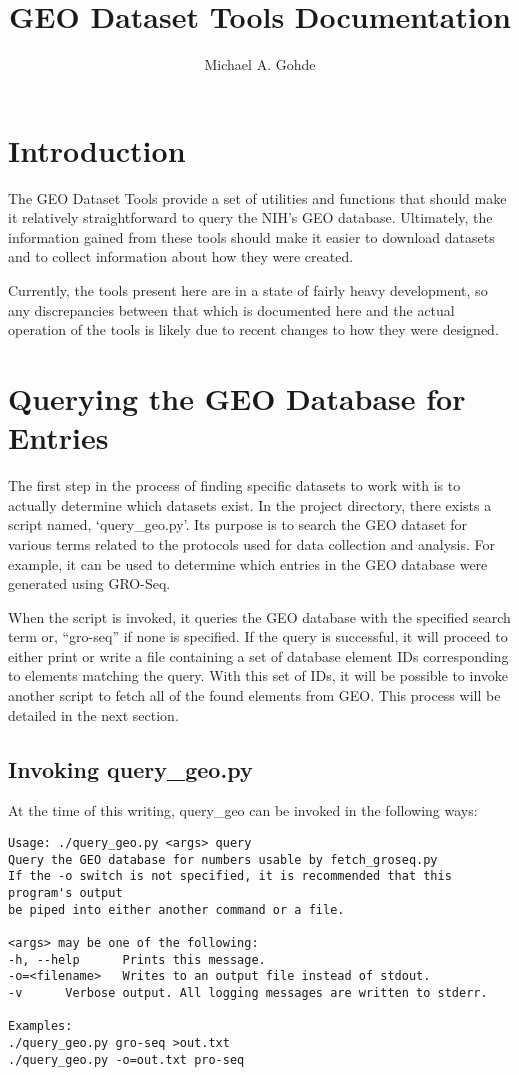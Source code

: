 \documentclass[12pt,letterpaper]{article}
\begin{document}
\title{GEO Dataset Tools Documentation}
\author{Michael A. Gohde}
\maketitle

\section{Introduction}
The GEO Dataset Tools provide a set of utilities and functions that should make it relatively straightforward to 
query the NIH's GEO database. Ultimately, the information gained from these tools should make it easier to download
datasets and to collect information about how they were created.

Currently, the tools present here are in a state of fairly heavy development, so any discrepancies between that which
is documented here and the actual operation of the tools is likely due to recent changes to how they were designed.

\section{Querying the GEO Database for Entries}
The first step in the process of finding specific datasets to work with is to actually determine which datasets exist. 
In the project directory, there exists a script named, `query\_geo.py'. Its purpose is to search the GEO dataset for various
terms related to the protocols used for data collection and analysis. For example, it can be used to determine which entries
in the GEO database were generated using GRO-Seq.

When the script is invoked, it queries the GEO database with the specified search term or, ``gro-seq'' if none is specified. If the
query is successful, it will proceed to either print or write a file containing a set of database element IDs corresponding to
elements matching the query. With this set of IDs, it will be possible to invoke another script to fetch all of the found elements from GEO.
This process will be detailed in the next section.

\subsection{Invoking query\_geo.py}
At the time of this writing, query\_geo can be invoked in the following ways:

\begin{verbatim}
Usage: ./query_geo.py <args> query
Query the GEO database for numbers usable by fetch_groseq.py
If the -o switch is not specified, it is recommended that this program's output
be piped into either another command or a file.

<args> may be one of the following:
-h, --help      Prints this message.
-o=<filename>   Writes to an output file instead of stdout.
-v      Verbose output. All logging messages are written to stderr.

Examples:
./query_geo.py gro-seq >out.txt
./query_geo.py -o=out.txt pro-seq
\end{verbatim}
\end{document}
